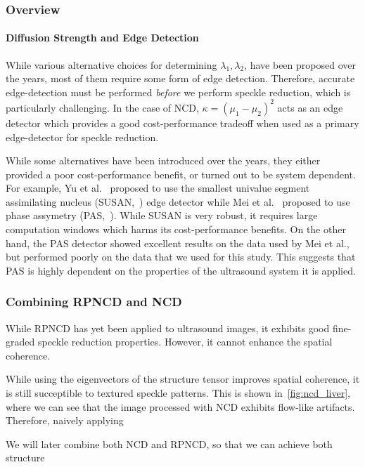 \cite{10.1145/2010324.1964963}


\subsubsection{Overview}


\paragraph{Diffusion Strength and Edge Detection}
While various alternative choices for determining \(\lambda_1, \lambda_2\), have been proposed over the years, most of them require some form of edge detection.
Therefore, accurate edge-detection must be performed \textit{before} we perform speckle reduction, which is particularly challenging.
In the case of NCD, \(\kappa = {(\mu_1 - \mu_2)}^2\) acts as an edge detector which provides a good cost-performance tradeoff when used as a primary edge-detector for speckle reduction.

While some alternatives have been introduced over the years, they either provided a poor cost-performance benefit, or turned out to be system dependent.
For example, Yu et al.~\cite{yu_ultrasound_2010} proposed to use the smallest univalue segment assimilating nucleus (SUSAN,~\cite{smith_susan_1997}) edge detector while Mei et al.~\cite{mei_phase_2020} proposed to use phase assymetry (PAS,~\cite{kovesi_image_1999}).
While SUSAN is very robust, it requires large computation windows which harms its cost-performance benefits.
On the other hand, the PAS detector showed excellent results on the data used by Mei et al., but performed poorly on the data that we used for this study.
This suggests that PAS is highly dependent on the properties of the ultrasound system it is applied.


\subsubsection{Combining RPNCD and NCD}
While RPNCD has yet been applied to ultrasound images, it exhibits good fine-graded speckle reduction properties.
However, it cannot enhance the spatial coherence.


While using the eigenvectors of the structure tensor improves spatial coherence, it is still succeptible to textured speckle patterns.
This is shown in~\cref{fig:ncd_liver}, where we can see that the image processed with NCD exhibits flow-like artifacts.
Therefore, naively applying 

We will later combine both NCD and RPNCD, so that we can achieve both structure 


